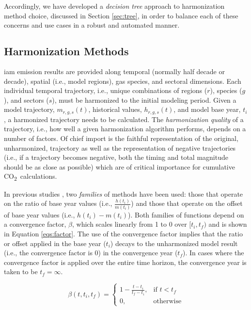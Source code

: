 \documentclass[review]{elsarticle}
\newcommand{\cotwo}{CO\textsubscript{2}~}
\begin{document}
Accordingly, we have developed a \textit{decision tree} approach to
harmonization method choice, discussed in Section \ref{sec:tree}, in order to
balance each of these concerns and use cases in a robust and automated manner.

\subsection{Harmonization Methods}\label{sec:harm-methods}

\gls{iam} emission results are provided along temporal (normally half decade or
decade), spatial (i.e., model regions), gas species, and sectoral
dimensions. Each individual temporal trajectory, i.e., unique combinations of
regions ($r$), species ($g$), and sectors ($s$), must be harmonized to the
initial modeling period. Given a model trajectory, $m_{r, g, s}(t)$, historical
values, $h_{r, g, s}(t)$, and model base year, $t_i$, a harmonized trajectory
needs to be calculated. The \textit{harmonization quality} of a trajectory,
i.e., how well a given harmonization algorithm performs, depends on a number of
factors. Of chief import is the faithful representation of the original,
unharmonized, trajectory as well as the representation of negative trajectories
(i.e., if a trajectory becomes negative, both the timing and total magnitude
should be as close as possible) which are of critical importance for cumulative
\cotwo calculations.

In previous studies \cite{meinshausen_rcp_2011,rogelj_discrepancies_2011}, two
\textit{families} of methods have been used: those that operate on the ratio of
base year values (i.e., $\frac{h(t_i)}{m(t_i)}$) and those that operate on the
offset of base year values (i.e., $h(t_i) - m(t_i)$). Both families of functions
depend on a convergence factor, $\beta$, which scales linearly from 1 to 0 over
$[t_i, t_f)$ and is shown in Equation \ref{eqs:factor}. The use of the
  convergence factor implies that the ratio or offset applied in the base year
  ($t_i$) decays to the unharmonized model result (i.e., the convergence factor
  is 0) in the convergence year ($t_f$). In cases where the convergence factor
  is applied over the entire time horizon, the convergence year is taken to be
  $t_f = \infty$.

\begin{equation}\label{eqs:factor}
  \beta(t, t_i, t_f) =
  \begin{cases}
    1 - \frac{t - t_i}{t_f - t_i},& \text{if } t < t_f\\
    0,                        & \text{otherwise}
  \end{cases}
\end{equation}
\end{document}
